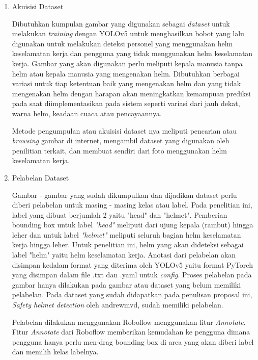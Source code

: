 \begin{enumerate}
  \item Akuisisi Dataset
  \par Dibutuhkan kumpulan gambar yang digunakan sebagai \emph{dataset} untuk melakukan \emph{training} dengan YOLOv5 untuk menghasilkan bobot yang lalu digunakan untuk melakukan 
  deteksi personel yang menggunakan helm keselamatan kerja dan pengguna yang tidak menggunakan helm keselamatan kerja. Gambar yang akan digunakan perlu meliputi kepala manusia tanpa helm atau
  kepala manusia yang mengenakan helm. Dibutuhkan berbagai variasi untuk tiap ketentuan baik yang mengenakan helm dan yang tidak mengenakan helm dengan harapan akan meningkatkan kemampuan
  prediksi pada saat diimplementasikan pada sistem seperti variasi dari jauh dekat, warna helm, keadaan cuaca atau pencayaannya.
  \par Metode pengumpulan atau akuisisi dataset nya meliputi pencarian atau \emph{browsing} gambar di internet, mengambil dataset yang digunakan oleh penilitian terkait, dan membuat sendiri dari foto
  menggunakan helm keselamatan kerja.

  \item Pelabelan Dataset
  \par Gambar - gambar yang sudah dikumpulkan dan dijadikan dataset perlu diberi pelabelan untuk masing - masing kelas atau label. Pada penelitian ini, label yang dibuat berjumlah 2 yaitu 
  "head" dan "helmet". Pemberian bounding box untuk label \emph{"head"} meliputi dari ujung kepala (rambut) hingga leher dan untuk label \emph{"helmet"} meliputi seluruh bagian helm 
  keselamatan kerja hingga leher. Untuk penelitian ini, helm yang akan dideteksi sebagai label "helm" yaitu helm keselamatan kerja. Anotasi dari pelabelan akan disimpan kedalam format yang diterima oleh YOLOv5 yaitu format PyTorch yang disimpan dalam file .txt dan .yaml untuk \emph{config}.
  Proses pelabelan pada gambar hanya dilakukan pada gambar atau dataset yang belum memiliki pelabelan. Pada dataset yang sudah didapatkan pada penulisan proposal ini, \emph{Safety helmet detection} oleh andrewmvd, sudah memiliki
  pelabelan.
  \par Pelabelan dilakukan menggunakan Roboflow menggunakan fitur \emph{Annotate}. Fitur \emph{Annotate} dari Roboflow memberikan kemudahan ke pengguna dimana pengguna hanya perlu men-drag bounding
  box di area yang akan diberi label dan memilih kelas labelnya. 
  

\end{enumerate}
